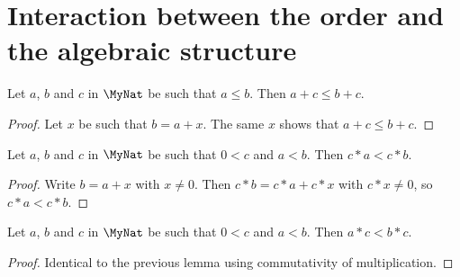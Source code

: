 \section{Interaction between the order and the algebraic structure}

\begin{lemma}
    \label{MyNat.add_le_add_left}
    \leanok
    Let $a$, $b$ and $c$ in $\MyNat$ be such that $a \leq b$. Then $a + c \leq b + c$.
\end{lemma}
\begin{proof}
    \leanok
    Let $x$ be such that $b = a + x$. The same $x$ shows that $a + c \leq b + c$.
\end{proof}

\begin{lemma}
    \label{MyNat.mul_lt_mul_of_pos_left}
    \leanok
    Let $a$, $b$ and $c$ in $\MyNat$ be such that $0 < c$ and $a < b$. Then $c * a < c * b$.
\end{lemma}
\begin{proof}
    \leanok
    Write $b = a + x$ with $x \neq 0$. Then $c * b = c * a + c * x$ with $c * x \neq 0$, so
    $c * a < c * b$.
\end{proof}

\begin{lemma}
    \label{MyNat.mul_lt_mul_of_pos_right}
    \leanok
    Let $a$, $b$ and $c$ in $\MyNat$ be such that $0 < c$ and $a < b$. Then $a * c < b * c$.
\end{lemma}
\begin{proof}
    \leanok
    Identical to the previous lemma using commutativity of multiplication.
\end{proof}

